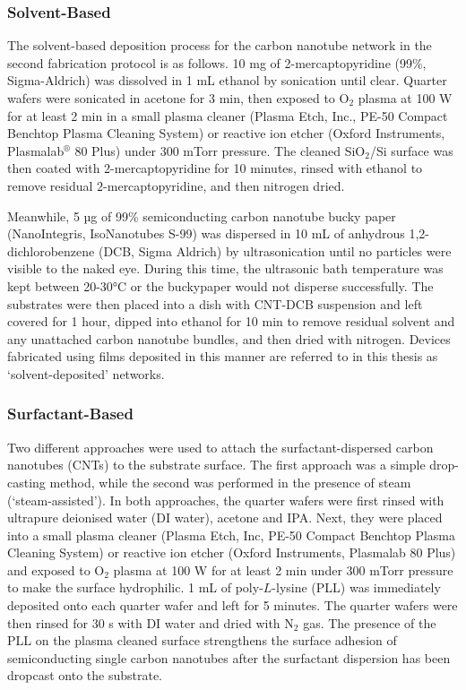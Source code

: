 \documentclass[
  a4paper,
]{scrbook}
\begin{document}
\hypertarget{solvent-based}{%
\subsubsection*{Solvent-Based}\label{solvent-based}}

The solvent-based deposition process for the carbon nanotube network in
the second fabrication protocol is as follows. 10 mg of
2-mercaptopyridine (99\%, Sigma-Aldrich) was dissolved in 1 mL ethanol
by sonication until clear. Quarter wafers were sonicated in acetone for
3 min, then exposed to O\(_2\) plasma at 100 W for at least 2 min in a
small plasma cleaner (Plasma Etch, Inc., PE-50 Compact Benchtop Plasma
Cleaning System) or reactive ion etcher (Oxford Instruments,
Plasmalab\(^\circledR\) 80 Plus) under 300 mTorr pressure. The cleaned
SiO\(_2\)/Si surface was then coated with 2-mercaptopyridine for 10
minutes, rinsed with ethanol to remove residual \(2\)-mercaptopyridine,
and then nitrogen dried.

Meanwhile, 5 µg of 99\% semiconducting carbon nanotube bucky paper
(NanoIntegris, IsoNanotubes S-99) was dispersed in 10 mL of anhydrous
1,2-dichlorobenzene (DCB, Sigma Aldrich) by ultrasonication until no
particles were visible to the naked eye. During this time, the
ultrasonic bath temperature was kept between 20-30°C or the buckypaper
would not disperse successfully. The substrates were then placed into a
dish with CNT-DCB suspension and left covered for 1 hour, dipped into
ethanol for 10 min to remove residual solvent and any unattached carbon
nanotube bundles, and then dried with nitrogen. Devices fabricated using
films deposited in this manner are referred to in this thesis as
`solvent-deposited' networks.

\hypertarget{surfactant-based}{%
\subsubsection*{Surfactant-Based}\label{surfactant-based}}

Two different approaches were used to attach the surfactant-dispersed
carbon nanotubes (CNTs) to the substrate surface. The first approach was
a simple drop-casting method, while the second was performed in the
presence of steam (`steam-assisted'). In both approaches, the quarter
wafers were first rinsed with ultrapure deionised water (DI water),
acetone and IPA. Next, they were placed into a small plasma cleaner
(Plasma Etch, Inc, PE-50 Compact Benchtop Plasma Cleaning System) or
reactive ion etcher (Oxford Instruments, Plasmalab 80 Plus) and exposed
to O\(_2\) plasma at 100 W for at least 2 min under 300 mTorr pressure
to make the surface hydrophilic. 1 mL of poly-\(L\)-lysine (PLL) was
immediately deposited onto each quarter wafer and left for 5 minutes.
The quarter wafers were then rinsed for 30 s with DI water and dried
with N\(_2\) gas. The presence of the PLL on the plasma cleaned surface
strengthens the surface adhesion of semiconducting single carbon
nanotubes after the surfactant dispersion has been dropcast onto the
substrate.
\end{document}
